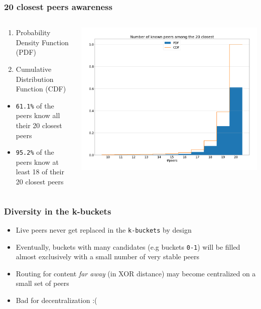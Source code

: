 \documentclass{pl-slide}
\begin{document}
\begin{frame}
\frametitle{20 closest peers awareness}

\begin{columns}[onlytextwidth]
\begin{column}{0.38\textwidth}
\begin{enumerate}
   	\item Probability Density Function (PDF)
   	\item Cumulative Distribution Function (CDF)
\end{enumerate}
\bigskip
\begin{itemize}
   	\item \texttt{61.1\%} of the peers know all their 20 closest peers
   	\item \texttt{95.2\%} of the peers know at least 18 of their 20 closest peers
\end{itemize}
\end{column}
\begin{column}{0.58\textwidth}
    \begin{center}
		\includegraphics[width=\textwidth]{plots/known-peers-among-20-closest.png}
    \end{center}
\end{column}
\end{columns}
\end{frame}

\iffalse

\begin{frame}
\frametitle{Diversity in the k-buckets}

\begin{itemize}
	\item Live peers never get replaced in the \texttt{k-buckets} by design
	\item Eventually, buckets with many candidates (e.g buckets \texttt{0-1}) will be filled almost exclusively with a small number of very stable peers
	\item Routing for content \textit{far away} (in XOR distance) may become centralized on a small set of peers
	\item Bad for decentralization :(
\end{itemize}
\end{frame}
\end{document}
